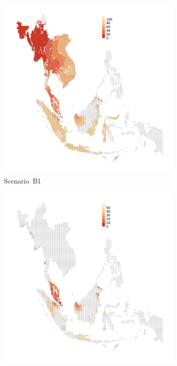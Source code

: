 \documentclass[11pt]{article}
\theoremstyle{definition}
\begin{document}
\begin{figure}[ht]
    \centering
    \begin{subfigure}[b]{.32\textwidth}
        \includegraphics[width=\textwidth,trim={3cm 3cm 8cm 3cm},clip]{figs/spread_BGD.png}
    \caption{Scenario~B1\label{fig:spreadBGD}}
    \end{subfigure}
    \begin{subfigure}[b]{.32\textwidth}
        \includegraphics[width=\textwidth,trim={4cm 2cm 8cm 12cm},clip]{figs/spread_MYS.png}

\end{subfigure}
\end{figure}
\end{document}
